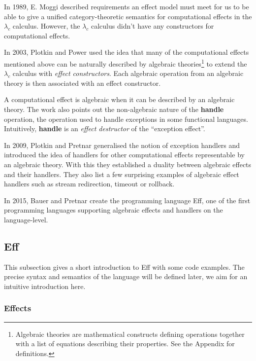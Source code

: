 \documentclass[class=article,crop=false,11pt]{standalone}
\begin{document}
In 1989, E. Moggi \cite{moggi1989computational,moggi1990abstract} described requirements an effect
model must meet for us to be able to give a unified category-theoretic semantics for computational effects in the $\lambda_c$ calculus. However, the $\lambda_c$ calculus didn't have any constructors for computational effects.

In 2003, Plotkin and Power \cite{plotkin2003algebraic} used the idea that many of the computational effects mentioned above can be naturally described by algebraic theories\footnote{Algebraic theories are mathematical constructs defining operations together with a list of equations describing their properties. See the Appendix for definitions.}
to extend the $\lambda_c$ calculus with \emph{effect constructors}. Each algebraic operation from an algebraic theory is then associated with an effect constructor. 

A computational effect is algebraic when it can be described by an algebraic theory.
The work also points out the non-algebraic nature of the \textbf{handle} operation, the operation used to handle exceptions in some functional languages. Intuitively, \textbf{handle} is an \emph{effect destructor} of the ``exception effect''.

In 2009, Plotkin and Pretnar \cite{plotkin2009handlers} generalised the notion of exception handlers and introduced the idea of handlers for other computational
effects representable by an algebraic theory. With this they established a duality between algebraic effects and their handlers. 
They also list a few surprising examples of algebraic effect handlers such as stream redirection, timeout or rollback.

In 2015, Bauer and Pretnar \cite{bauer2015programming} create the programming language Eff, one of the first programming languages supporting algebraic effects and
handlers on the language-level.

\subsection{Eff}

This subsection gives a short introduction to Eff with some code examples. The precise syntax and semantics of the language will be defined later, we aim for an intuitive introduction here.

\subsubsection{Effects}
\end{document}
